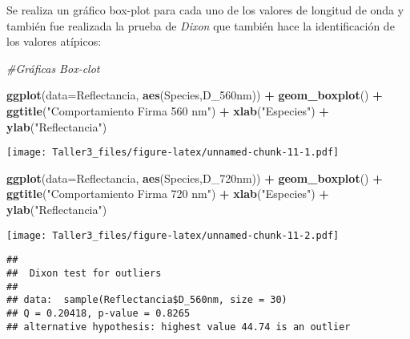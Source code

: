 \documentclass[
]{article}
\newenvironment{Shaded}{\begin{snugshade}}{\end{snugshade}}
\newcommand{\CommentTok}[1]{\textcolor[rgb]{0.56,0.35,0.01}{\textit{#1}}}
\newcommand{\DataTypeTok}[1]{\textcolor[rgb]{0.13,0.29,0.53}{#1}}
\newcommand{\DecValTok}[1]{\textcolor[rgb]{0.00,0.00,0.81}{#1}}
\newcommand{\KeywordTok}[1]{\textcolor[rgb]{0.13,0.29,0.53}{\textbf{#1}}}
\newcommand{\NormalTok}[1]{#1}
\newcommand{\OperatorTok}[1]{\textcolor[rgb]{0.81,0.36,0.00}{\textbf{#1}}}
\newcommand{\StringTok}[1]{\textcolor[rgb]{0.31,0.60,0.02}{#1}}
\begin{document}
Se realiza un gráfico box-plot para cada uno de los valores de longitud
de onda y también fue realizada la prueba de \emph{Dixon} que también
hace la identificación de los valores atípicos:

\begin{Shaded}
\begin{Highlighting}[]
\CommentTok{#Gráficas Box-clot}

\KeywordTok{ggplot}\NormalTok{(}\DataTypeTok{data=}\NormalTok{Reflectancia, }\KeywordTok{aes}\NormalTok{(Species,D_560nm)) }\OperatorTok{+}\StringTok{ }\KeywordTok{geom_boxplot}\NormalTok{() }\OperatorTok{+}\StringTok{ }\KeywordTok{ggtitle}\NormalTok{(}\StringTok{"Comportamiento Firma 560 nm"}\NormalTok{) }\OperatorTok{+}\StringTok{ }\KeywordTok{xlab}\NormalTok{(}\StringTok{"Especies"}\NormalTok{) }\OperatorTok{+}\StringTok{ }\KeywordTok{ylab}\NormalTok{(}\StringTok{"Reflectancia"}\NormalTok{)}
\end{Highlighting}
\end{Shaded}

\texttt{[image: Taller3\_files/figure-latex/unnamed-chunk-11-1.pdf]}

\begin{Shaded}
\begin{Highlighting}[]
\KeywordTok{ggplot}\NormalTok{(}\DataTypeTok{data=}\NormalTok{Reflectancia, }\KeywordTok{aes}\NormalTok{(Species,D_720nm)) }\OperatorTok{+}\StringTok{ }\KeywordTok{geom_boxplot}\NormalTok{() }\OperatorTok{+}\StringTok{ }\KeywordTok{ggtitle}\NormalTok{(}\StringTok{"Comportamiento Firma 720 nm"}\NormalTok{) }\OperatorTok{+}\StringTok{ }\KeywordTok{xlab}\NormalTok{(}\StringTok{"Especies"}\NormalTok{) }\OperatorTok{+}\StringTok{ }\KeywordTok{ylab}\NormalTok{(}\StringTok{"Reflectancia"}\NormalTok{)}
\end{Highlighting}
\end{Shaded}

\texttt{[image: Taller3\_files/figure-latex/unnamed-chunk-11-2.pdf]}

\begin{Shaded}
\end{Shaded}

\begin{verbatim}
## 
##  Dixon test for outliers
## 
## data:  sample(Reflectancia$D_560nm, size = 30)
## Q = 0.20418, p-value = 0.8265
## alternative hypothesis: highest value 44.74 is an outlier
\end{verbatim}
\end{document}
